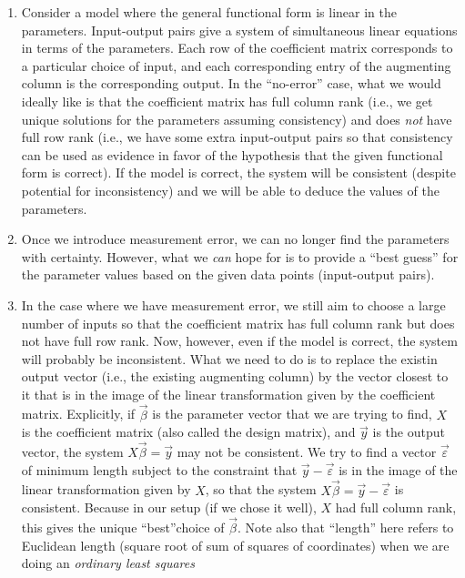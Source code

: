 \documentclass[10pt]{amsart}
\begin{document}
\begin{enumerate}
\item Consider a model where the general functional form is linear in
  the parameters. Input-output pairs give a system of simultaneous
  linear equations in terms of the parameters. Each row of the
  coefficient matrix corresponds to a particular choice of input, and
  each corresponding entry of the augmenting column is the
  corresponding output. In the ``no-error'' case, what we would
  ideally like is that the coefficient matrix has full column rank
  (i.e., we get unique solutions for the parameters assuming
  consistency) and does {\em not} have full row rank (i.e., we have
  some extra input-output pairs so that consistency can be used as
  evidence in favor of the hypothesis that the given functional form
  is correct). If the model is correct, the system will be consistent
  (despite potential for inconsistency) and we will be able to deduce
  the values of the parameters.
\item Once we introduce measurement error, we can no longer find the
  parameters with certainty. However, what we {\em can} hope for is to
  provide a ``best guess'' for the parameter values based on the given
  data points (input-output pairs).
\item In the case where we have measurement error, we still aim to
  choose a large number of inputs so that the coefficient matrix has
  full column rank but does not have full row rank. Now, however, even
  if the model is correct, the system will probably be
  inconsistent. What we need to do is to replace the existin output
  vector (i.e., the existing augmenting column) by the vector closest
  to it that is in the image of the linear transformation given by the
  coefficient matrix. Explicitly, if $\vec{\beta}$ is the parameter
  vector that we are trying to find, $X$ is the coefficient matrix
  (also called the design matrix), and $\vec{y}$ is the output vector,
  the system $X\vec{\beta} = \vec{y}$ may not be consistent. We try to
  find a vector $\vec{\varepsilon}$ of minimum length subject to the
  constraint that $\vec{y} - \vec{\varepsilon}$ is in the image of the
  linear transformation given by $X$, so that the system $X\vec{\beta}
  = \vec{y} - \vec{\varepsilon}$ is consistent. Because in our setup
  (if we chose it well), $X$ had full column rank, this gives the
  unique ``best''choice of $\vec{\beta}$. Note also that ``length''
  here refers to Euclidean length (square root of sum of squares of
  coordinates) when we are doing an {\em ordinary least squares
}
\end{enumerate}
\end{document}
